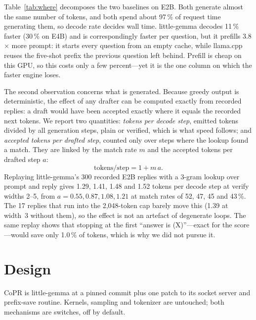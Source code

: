 \documentclass[conference]{IEEEtran}
\newcommand{\sys}{CoPR}
\newcommand{\lc}{llama.cpp}
\newcommand{\lgm}{little-gemma}
\begin{document}
Table~\ref{tab:where} decomposes the two baselines on E2B. Both generate almost
the same number of tokens, and both spend about 97\,\% of request time
generating them, so decode rate decides wall time. \lgm{} decodes 11\,\% faster
(30\,\% on E4B) and is correspondingly faster per question, but it prefills
3.8$\times$ more prompt: it starts every question from an empty cache, while
\lc{} reuses the five-shot prefix the previous question left behind. Prefill
is cheap on this GPU, so this costs only a few percent---yet it is the one
column on which the faster engine loses.

The second observation concerns what is generated. Because greedy output is
deterministic, the effect of any drafter can be computed exactly from recorded
replies: a draft would have been accepted exactly where it equals the recorded
next tokens. We report two quantities: \emph{tokens per decode step}, emitted
tokens divided by all generation steps, plain or verified, which is what
speed follows; and \emph{accepted tokens per drafted step}, counted only over
steps where the lookup found a match. They are linked by the match rate $m$
and the accepted tokens per drafted step $a$:
\begin{equation}
\text{tokens/step} = 1 + m\,a .
\end{equation}
Replaying
\lgm{}'s 300 recorded E2B replies with a 3-gram lookup over prompt and reply
gives 1.29, 1.41, 1.48 and 1.52 tokens per decode step at verify widths 2--5,
from $a = 0.55, 0.87, 1.08, 1.21$ at match rates of 52, 47, 45 and 43\,\%. The 17 replies that
run into the 2{,}048-token cap barely move this (1.39 at width~3 without them),
so the effect is not an artefact of degenerate loops. The same replay shows
that stopping at the first ``answer is (X)''---exact for the score---would save
only 1.0\,\% of tokens, which is why we did not pursue it.

\section{Design}\label{sec:design}

\sys{} is \lgm{} at a pinned commit plus one patch to its socket server and
prefix-save routine. Kernels, sampling and tokenizer are untouched; both
mechanisms are switches, off by default.
\end{document}
